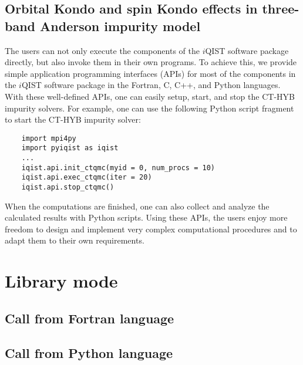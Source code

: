 \subsection{Orbital Kondo and spin Kondo effects in three-band Anderson impurity model}
The users can not only execute the components of the $i$QIST software package directly, but also invoke them in their own programs. To achieve this, we provide simple application programming interfaces (APIs) for most of the components in the $i$QIST software package in the Fortran, C, C++, and Python languages. With these well-defined APIs, one can easily setup, start, and stop the CT-HYB impurity solvers. For example, one can use the following Python script fragment to start the CT-HYB impurity solver:
\begin{verbatim}
    import mpi4py
    import pyiqist as iqist
    ...
    iqist.api.init_ctqmc(myid = 0, num_procs = 10)
    iqist.api.exec_ctqmc(iter = 20)
    iqist.api.stop_ctqmc()
\end{verbatim}
When the computations are finished, one can also collect and analyze the calculated results with Python scripts. Using these APIs, the users enjoy more freedom to design and implement very complex computational procedures and to adapt them to their own requirements.

\section{Library mode}
\subsection{Call {\iqist} from Fortran language}
\subsection{Call {\iqist} from Python language}
